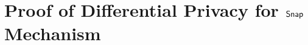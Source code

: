 \documentclass[a4paper,11pt]{article}
\begin{document}



\section{Proof of Differential Privacy for $\mathsf{Snap}$ Mechanism}
\end{document}
